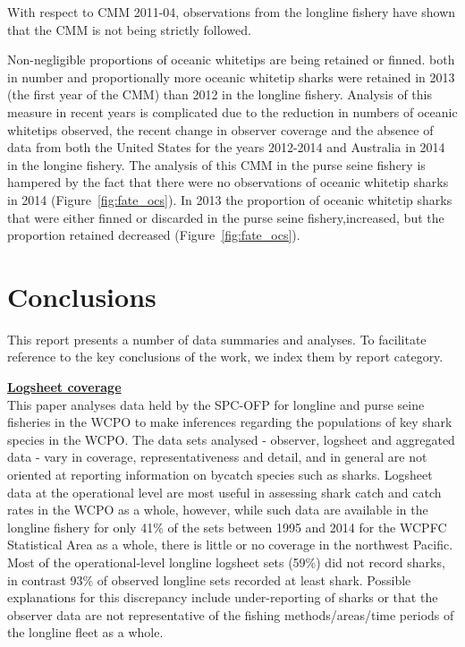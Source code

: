 \documentclass[12pt]{SCreport}
\begin{document}
With respect to CMM 2011-04, observations from the longline fishery have shown that the CMM is not being strictly followed. 

Non-negligible proportions of oceanic whitetips are being retained or finned. both in number and proportionally more oceanic whitetip sharks were retained in 2013 (the first year of the CMM) than 2012 in the longline fishery.   Analysis of this measure in recent years is complicated due to the reduction in numbers of oceanic whitetips observed, the recent change in observer coverage and  the absence of data from both the United States for the years 2012-2014  and Australia in 2014 in the longine fishery.   The analysis of this CMM in the purse seine fishery is hampered by the fact that there were no observations of oceanic whitetip sharks in 2014 (Figure~\ref{fig:fate_ocs}).  In 2013 the proportion of oceanic whitetip sharks that were either finned or discarded in the purse seine fishery,increased, but the proportion retained decreased (Figure~\ref{fig:fate_ocs}).

 

\section{Conclusions }

This report presents a number of data summaries and analyses.  To facilitate reference to the key conclusions of the work, we index them by report category.

\textbf{\underline{Logsheet coverage}}\\
This paper analyses data held by the SPC-OFP for longline and purse seine fisheries in the WCPO to make inferences regarding the populations of key shark species in the WCPO. The data sets analysed - observer, logsheet and aggregated data - vary in coverage, representativeness and detail, and in general are not oriented at reporting information on bycatch species such as sharks. Logsheet data at the operational level are most useful in assessing shark catch and catch rates in the WCPO as a whole, however, while such data are available in the longline fishery for only 41\% of the sets between 1995 and 2014 for the WCPFC Statistical Area as a whole, there is little or no coverage in the northwest Pacific. Most of the operational-level longline logsheet sets (59\%) did not record sharks, in contrast 93\% of observed longline sets recorded at least shark.  Possible explanations for this discrepancy include under-reporting of sharks or that the observer data are not representative of the fishing methods/areas/time periods of the longline fleet as a whole.
\end{document}
